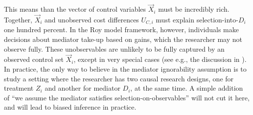 This means than the vector of control variables $\vec X_i$ must be incredibly rich.
Together, $\vec X_i$ and unobserved cost differences $U_{C,i}$ must explain selection-into-$D_i$ one hundred percent.
In the Roy model framework, however, individuals make decisions about mediator take-up based on gains, which the researcher may not observe fully. 
These unobservables are unlikely to be fully captured by an observed control set $\vec X_i$, except in very special cases (see e.g., the discussion in \citealt{angrist2009mostly,angrist2022empirical}).
In practice, the only way to believe in the mediator ignorability assumption is to study a setting where the researcher has two causal research designs, one for treatment $Z_i$ and another for mediator $D_i$, at the same time.
A simple addition of ``we assume the mediator satisfies selection-on-observables'' will not cut it here, and will lead to biased inference in practice.

% 
% 
% 

